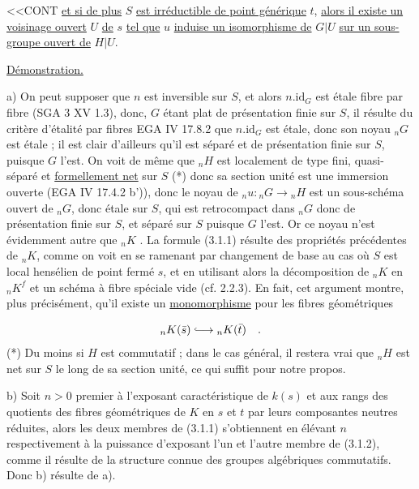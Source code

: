 
<<CONT \underline{et si de plus} $S$ \underline{est irréductible de point générique} $t$, \underline{alors il existe un voisinage ouvert} $U$ \underline{de} $s$ \underline{tel que} $u$ \underline{induise un isomorphisme de} $G|U$ \underline{sur un sous-groupe ouvert de} $H|U$.

\underline{Démonstration.}

a) On peut supposer que $n$ est inversible sur $S$, et alors $n.\mathrm{id}_{G}$ est étale fibre par fibre (SGA 3 XV 1.3), donc, $G$ étant plat de présentation finie sur $S$, il résulte du critère d'étalité par fibres EGA IV 17.8.2 que $n.\mathrm{id}_{G}$ est étale, donc son noyau ${}_{n}G$ est étale ; il est clair d'ailleurs qu'il est séparé et de présentation finie sur $S$, puisque $G$ l'est. On voit de même que ${}_{n}H$ est localement de type fini, quasi-séparé et \underline{formellement net} sur $S$ (*) donc sa section unité est une immersion ouverte (EGA IV 17.4.2 b')), donc le noyau de ${}_{n}u: {}_{n}G \longrightarrow {}_{n}H$ est un sous-schéma ouvert de ${}_{n}G$, donc étale sur $S$, qui est retrocompact dans ${}_{n}G$ donc de présentation finie sur $S$, et séparé sur $S$ puisque $G$ l'est. Or ce noyau n'est évidemment autre que ${}_{n}K$ . La formule (3.1.1) résulte des propriétés précédentes de ${}_{n}K$, comme on voit en se ramenant par changement de base au cas où $S$ est local hensélien de point fermé $s$, et en utilisant alors la décomposition de ${}_{n}K$ en ${}_{n}K^{f}$ et un schéma à fibre spéciale vide (cf. 2.2.3). En fait, cet argument montre, plus précisément, qu'il existe un \underline{monomorphisme} pour les fibres géométriques

\begin{equation*}
{}_{n}K(\bar{s}) \lhook\joinrel\longrightarrow {}_{n}K(\bar{t}) \quad .
\end{equation*}
(*) Du moins si $H$ est commutatif ; dans le cas général, il restera vrai que ${}_{n}H$ est net sur $S$ le long de sa section unité, ce qui suffit pour notre propos.



b)   Soit $n > 0$ premier à l'exposant caractéristique de $k(s)$ et aux rangs des quotients des fibres géométriques de $K$ en $s$ et $t$ par leurs composantes neutres réduites, alors les deux membres de (3.1.1) s'obtiennent en élévant $n$ respectivement à la puissance d'exposant l'un et l'autre membre de (3.1.2), comme il résulte de la structure connue des groupes algébriques commutatifs. Donc b) résulte de a).

